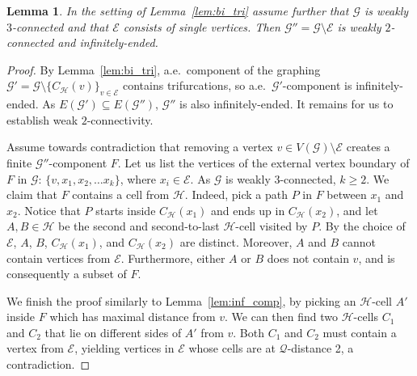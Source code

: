 \documentclass{article}
\theoremstyle{plain}
\newtheorem{lem}[thm]{Lemma}
\theoremstyle{definition}
\newcommand{\cG}{\mathcal{G}}
\newcommand{\cQ}{\mathcal{Q}}
\newcommand{\cE}{\mathcal{E}}
\newcommand{\cH}{\mathcal{H}}
\begin{document}
\begin{lem} \label{lem:sparse_removal_from_$3$-connected}
    In the setting of Lemma~\ref{lem:bi_tri} assume further that $\cG$ is weakly $3$-connected and that $\cE$ consists of single vertices.
    Then $\cG''=\cG \setminus \cE$ is weakly $2$-connected and infinitely-ended.  
\end{lem}
\begin{proof}
    By Lemma~\ref{lem:bi_tri}, a.e.~component of the graphing $\cG'=\cG\setminus \{C_{\cH}(v)\}_{v\in \cE}$ contains trifurcations, so a.e.~$\cG'$-component is infinitely-ended. As $E(\cG') \subseteq E(\cG'')$, $\cG''$ is also infinitely-ended. It remains for us to establish weak $2$-connectivity. 

    Assume towards contradiction that removing a vertex $v \in V(\cG)\setminus \cE$ creates a finite $\cG''$-component $F$. Let us list the vertices of the external vertex boundary of $F$ in $\cG$: $\{v, x_1, x_2, \ldots x_k\}$, where $x_i \in \cE$. As $\cG$ is weakly $3$-connected, $k \geq 2$. We claim that $F$ contains a cell from $\cH$. Indeed, pick a path $P$ in $F$ between $x_1$ and $x_2$. Notice that $P$ starts inside $C_{\cH}(x_1)$ and ends up in $C_{\cH}(x_2)$, and let $A,B \in \cH$ be the second and second-to-last $\cH$-cell visited by $P$. By the choice of $\cE$, $A$, $B$, $C_{\cH}(x_1)$, and $C_{\cH}(x_2)$ are distinct. Moreover, $A$ and $B$ cannot contain vertices from $\cE$. Furthermore, either $A$ or $B$ does not contain $v$, and is consequently a subset of $F$.   
    
    We finish the proof similarly to Lemma~\ref{lem:inf_comp}, by picking an $\cH$-cell $A'$ inside $F$ which has maximal distance from $v$. We can then find two $\cH$-cells $C_1$ and $C_2$ that lie on different sides of $A'$ from $v$. Both $C_1$ and $C_2$ must contain a vertex from $\cE$, yielding vertices in $\cE$ whose cells are at $\cQ$-distance 2, a contradiction. 
\end{proof}
\end{document}
